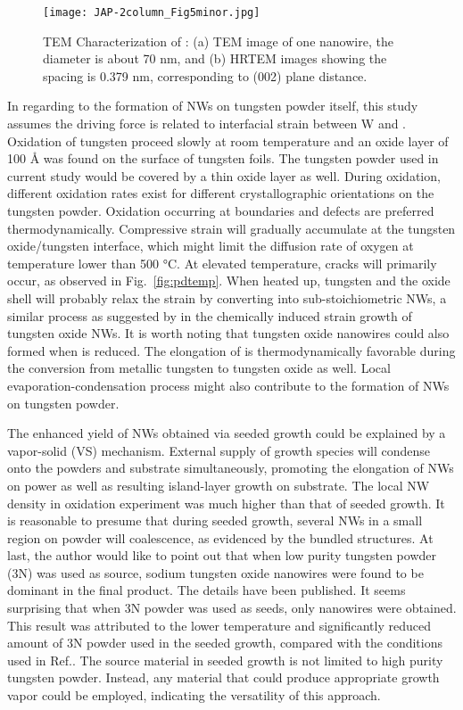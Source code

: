 \begin{figure}[htb]
\centering
\texttt{[image: JAP-2column\_Fig5minor.jpg]}
\caption[Characterization of : TEM cont]{TEM Characterization of : (a) TEM image of one nanowire, the diameter is about 70 nm, and (b) HRTEM images showing the spacing is 0.379 nm, corresponding to (002) plane distance.}
\label{fig:woseedtem2}
\end{figure}

In regarding to the formation of NWs on tungsten powder itself, this study assumes the driving force is related to interfacial strain between W and . Oxidation of tungsten proceed slowly at room temperature and an oxide layer of 100 \si{\angstrom} was found on the surface of tungsten foils.\cite{Warren1996} The tungsten powder used in current study would be covered by a thin oxide layer as well. During oxidation, different oxidation rates exist for different crystallographic orientations on the tungsten powder. Oxidation occurring at boundaries and defects are preferred thermodynamically.\cite{You2010} Compressive strain will gradually accumulate at the tungsten oxide/tungsten interface, which might limit the diffusion rate of oxygen at temperature lower than 500 \si{\degreeCelsius}.\cite{tungsten1999} At elevated temperature, cracks will primarily occur, as observed in Fig.~\ref{fig:pdtemp}. When heated up, tungsten and the oxide shell will probably relax the strain by converting into sub-stoichiometric NWs, a similar process as suggested by \citeauthor{Klinke2005} in the chemically induced strain growth of tungsten oxide NWs.\cite{Klinke2005} It is worth noting that tungsten oxide nanowires could also formed when  is reduced.\cite{Sarin1975} The elongation of  is thermodynamically favorable during the conversion from metallic tungsten to tungsten oxide as well. Local evaporation-condensation process might also contribute to the formation of NWs on tungsten powder.

The enhanced yield of NWs obtained via seeded growth could be explained by a vapor-solid (VS) mechanism. External supply of growth species will condense onto the powders and substrate simultaneously, promoting the elongation of NWs on power as well as resulting island-layer growth on substrate. The local NW density in oxidation experiment was much higher than that of seeded growth. It is reasonable to presume that during seeded growth, several NWs in a small region on powder will coalescence, as evidenced by the bundled structures. At last, the author would like to point out that when low purity tungsten powder (3N) was used as source, sodium tungsten oxide nanowires were found to be dominant in the final product. The details have been published.\cite{Sheng2014} It seems surprising that when 3N powder was used as seeds, only  nanowires were obtained. This result was attributed to the lower temperature and significantly reduced amount of 3N powder used in the seeded growth, compared with the conditions used in Ref.\cite{Sheng2014}. The source material in seeded growth is not limited to high purity tungsten powder. Instead, any material that could produce appropriate growth vapor could be employed, indicating the versatility of this approach.

